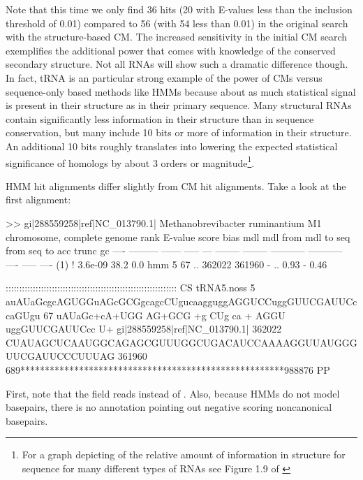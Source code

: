Note that this time we only find 36 hits (20 with E-values less than
the inclusion threshold of 0.01) compared to 56 (with 54 less than
0.01) in the original search with the structure-based CM. The
increased sensitivity in the initial CM search exemplifies the
additional power that comes with knowledge of the conserved secondary
structure. Not all RNAs will show such a dramatic difference
though. In fact, tRNA is an particular strong example of the power of
CMs versus sequence-only based methods like HMMs because about as much
statistical signal is present in their structure as in their primary
sequence. Many structural RNAs contain significantly less information
in their structure than in sequence conservation, but many include
10 bits or more of information in their structure. An additional
10 bits roughly translates into lowering the expected statistical
significance of homologs by about 3 orders or magnitude\footnote{For a
  graph depicting of the relative amount of information in structure
  for sequence for many different types of RNAs see Figure 1.9 of
  \cite{Nawrocki09}}.

HMM hit alignments differ slightly from CM hit alignments. Take a look
at the first alignment:

\begin{sreoutput}
>> gi|288559258|ref|NC_013790.1|  Methanobrevibacter ruminantium M1 chromosome, complete genome
 rank     E-value  score  bias mdl mdl from   mdl to       seq from      seq to       acc trunc   gc
 ----   --------- ------ ----- --- -------- --------    ----------- -----------      ---- ----- ----
  (1) !   3.6e-09   38.2   0.0 hmm        5       67 ..      362022      361960 - .. 0.93     - 0.46

                                       ::::::::::::::::::::::::::::::::::::::::::::::::::::::::::::::: CS
                     tRNA5.noss      5 auAUaGcgcAGUGGuAGcGCGgcagcCUgucaagguggAGGUCCuggGUUCGAUUCccaGUgu 67    
                                        uAUaGc+cA+UGG AG+GCG  +g CUg ca  +   AGGU  uggGUUCGAUUCcc  U+ 
  gi|288559258|ref|NC_013790.1| 362022 CUAUAGCUCAAUGGCAGAGCGUUUGGCUGACAUCCAAAAGGUUAUGGGUUCGAUUCCCUUUAG 361960
                                       689******************************************************988876 PP
\end{sreoutput}

First, note that the  field reads  instead of
. Also, because HMMs do not model basepairs, there is no
 annotation pointing out negative scoring noncanonical
basepairs.

